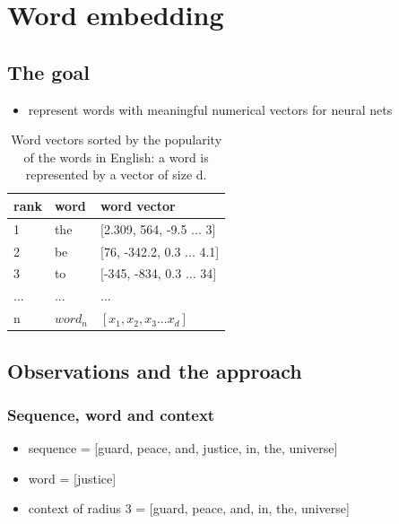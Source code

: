 \documentclass{article}
\begin{document}
\section{Word embedding}

\subsection{The goal}
\begin{itemize}
	\item represent words with meaningful numerical vectors for neural nets
\end{itemize}
\begin{table}[H]
	\centering
	\begin{tabularx}{\textwidth}{|X|X|X|} \hline
		rank & word & word vector \\ \hline
		1 & the & [2.309, 564, -9.5 ... 3] \\ \hline
		2 & be & [76, -342.2, 0.3 ... 4.1] \\ \hline
		3 & to & [-345, -834, 0.3 ... 34] \\ \hline
		... & ... & ... \\ \hline
		n & $ word_n $ & $ [x_1, x_2, x_3 ... x_d] $ \\ \hline
	\end{tabularx}
	\caption{Word vectors sorted by the popularity of the words in English: a word is represented by a vector of size d.}
	\label{tab:word}
\end{table}

\subsection{Observations and the approach}

\subsubsection{Sequence, word and context}
\begin{itemize}
	\item sequence = [guard, peace, and, justice, in, the, universe]
	\item word = [justice]
	\item context of radius 3 = [guard, peace, and, in, the, universe]
\end{itemize}
\end{document}
